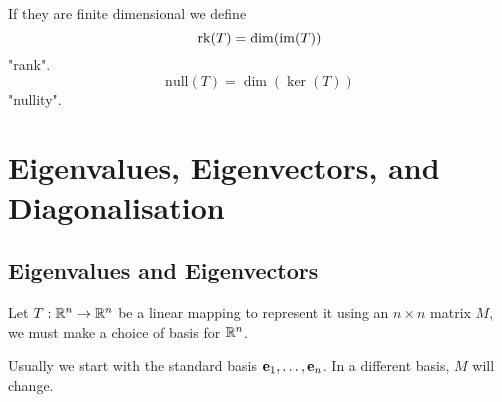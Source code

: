 \documentclass[10pt, a4paper]{article}
\begin{document}
\begin{definition}
    If they are finite dimensional we define
    \[
    \mathrm{rk}(T) = \dim(\operatorname{im}(T))
    \]
    "rank".
    \[
    \mathrm{null}(T) = \dim(\ker(T))
    \]
    "nullity".
\end{definition}

\newpage

\section{Eigenvalues, Eigenvectors, and Diagonalisation}

\subsection{Eigenvalues and Eigenvectors}
Let $T : \mathbb{R} ^ n \rightarrow \mathbb{R} ^ n$ be a linear mapping to represent it using an $n \times n$ matrix $M$,
we must make a choice of basis for $\mathbb{R} ^ n$.

Usually we start with the standard basis $\mathbf{e}_1, \dotsc, \mathbf{e}_n$.
In a different basis,
$M$ will change.
\end{document}
